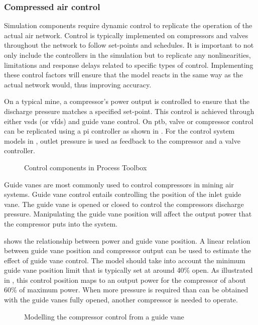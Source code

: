 		\subsubsection{Compressed air control}\label{Controllers}
			Simulation components require dynamic control to replicate the operation of the actual air network. Control is typically implemented on compressors and valves throughout the network to follow  set-points and schedules. It is important to not only include the controllers in the simulation but to replicate any nonlinearities, limitations and response delays related to specific types of control. Implementing these control factors will ensure that the model reacts in the same way as the actual network would, thus improving accuracy.
			\par 
			On a typical mine, a compressor's power output is controlled to ensure that the discharge pressure matches a specified  set-point. This control is achieved through either \glspl{vsd} (or \glspl{vfd}) and guide vane control. On \gls{ptb}, valve or compressor control can be replicated using a \gls{pi} controller as shown in . For the control system models in , outlet pressure is used as feedback to the compressor and a valve controller. 
			\par 
			
	\begin{figure}[h!]
		\centering
		\caption[Control components in Process Toolbox]{Control components in Process Toolbox}
		\label{fig: Controller models}
	\end{figure}
		Guide vanes are most commonly used to control compressors in mining air systems. Guide vane control entails controlling the position of the inlet guide vane. The guide vane is opened or closed to control the compressors discharge pressure. Manipulating the guide vane position will affect the output power that the compressor puts into the system. 
		\par 
		 shows the relationship between power and guide vane position. A linear relation between guide vane position and compressor output can be used to estimate the effect of guide vane control. The model should take into account the minimum guide vane position limit that is typically set at around 40\% open. As illustrated in , this control position maps to an output power for the compressor of about 60\% of maximum power. When more pressure is required than can be obtained with the guide vanes fully opened, another compressor is needed to operate. 
		\begin{figure}[h]
			\centering
			\fbox{}
			\caption{Modelling the compressor control from a guide vane\protect \footnotemark[1]}
			\label{fig: Guide vane position}
		\end{figure}
	
